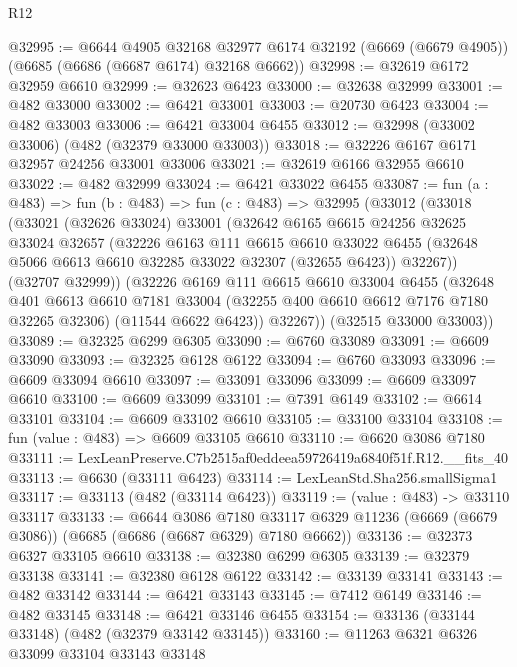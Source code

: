 \begin{lexlean}{R12}
\begin{coremodule}
@32995 := @6644
    @4905
    @32168
    @32977
    @6174
    @32192
    (@6669 (@6679 @4905))
    (@6685 (@6686 (@6687 @6174) @32168 @6662))
@32998 := @32619 @6172 @32959 @6610
@32999 := @32623 @6423
@33000 := @32638 @32999
@33001 := @482 @33000
@33002 := @6421 @33001
@33003 := @20730 @6423
@33004 := @482 @33003
@33006 := @6421 @33004 @6455
@33012 := @32998 (@33002 @33006) (@482 (@32379 @33000 @33003))
@33018 := @32226 @6167 @6171 @32957 @24256 @33001 @33006
@33021 := @32619 @6166 @32955 @6610
@33022 := @482 @32999
@33024 := @6421 @33022 @6455
@33087 := fun (a : @483) =>
  fun (b : @483) =>
  fun (c : @483) =>
  @32995
    (@33012
      (@33018
        (@33021
          (@32626 @33024)
          @33001
          (@32642
            @6165
            @6615
            @24256
            @32625
            @33024
            @32657
            (@32226
              @6163
              @111
              @6615
              @6610
              @33022
              @6455
              (@32648 @5066 @6613 @6610 @32285 @33022 @32307 (@32655 @6423))
              @32267))
          (@32707 @32999))
        (@32226
          @6169
          @111
          @6615
          @6610
          @33004
          @6455
          (@32648
            @401
            @6613
            @6610
            @7181
            @33004
            (@32255 @400 @6610 @6612 @7176 @7180 @32265 @32306)
            (@11544 @6622 @6423))
          @32267))
      (@32515 @33000 @33003))
@33089 := @32325 @6299 @6305
@33090 := @6760 @33089
@33091 := @6609 @33090
@33093 := @32325 @6128 @6122
@33094 := @6760 @33093
@33096 := @6609 @33094 @6610
@33097 := @33091 @33096
@33099 := @6609 @33097 @6610
@33100 := @6609 @33099
@33101 := @7391 @6149
@33102 := @6614 @33101
@33104 := @6609 @33102 @6610
@33105 := @33100 @33104
@33108 := fun (value : @483) => @6609 @33105 @6610
@33110 := @6620 @3086 @7180
@33111 := LexLeanPreserve.C7b2515af0eddeea59726419a6840f51f.R12.__fits_40
@33113 := @6630 (@33111 @6423)
@33114 := LexLeanStd.Sha256.smallSigma1
@33117 := @33113 (@482 (@33114 @6423))
@33119 := (value : @483) -> @33110 @33117
@33133 := @6644
    @3086
    @7180
    @33117
    @6329
    @11236
    (@6669 (@6679 @3086))
    (@6685 (@6686 (@6687 @6329) @7180 @6662))
@33136 := @32373 @6327 @33105 @6610
@33138 := @32380 @6299 @6305
@33139 := @32379 @33138
@33141 := @32380 @6128 @6122
@33142 := @33139 @33141
@33143 := @482 @33142
@33144 := @6421 @33143
@33145 := @7412 @6149
@33146 := @482 @33145
@33148 := @6421 @33146 @6455
@33154 := @33136 (@33144 @33148) (@482 (@32379 @33142 @33145))
@33160 := @11263 @6321 @6326 @33099 @33104 @33143 @33148

\end{coremodule}
\end{lexlean}
